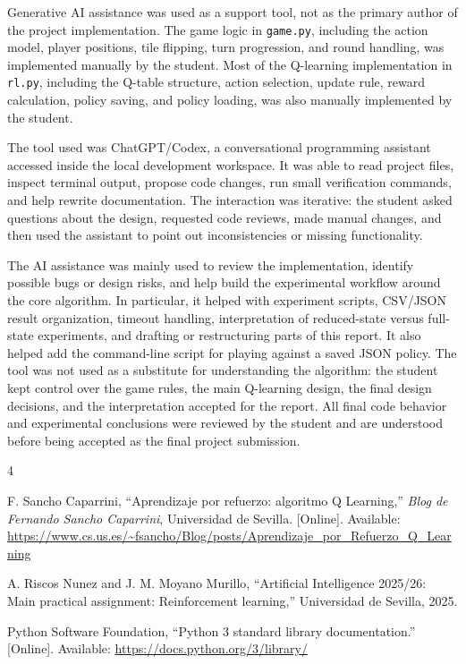 \documentclass[conference]{IEEEtran}
\begin{document}
Generative AI assistance was used as a support tool, not as the primary author of
the project implementation. The game logic in \texttt{game.py}, including the
action model, player positions, tile flipping, turn progression, and round
handling, was implemented manually by the student. Most of the Q-learning
implementation in \texttt{rl.py}, including the Q-table structure, action
selection, update rule, reward calculation, policy saving, and policy loading, was
also manually implemented by the student.

The tool used was ChatGPT/Codex, a conversational programming assistant accessed
inside the local development workspace. It was able to read project files, inspect
terminal output, propose code changes, run small verification commands, and help
rewrite documentation. The interaction was iterative: the student asked questions
about the design, requested code reviews, made manual changes, and then used the
assistant to point out inconsistencies or missing functionality.

The AI assistance was mainly used to review the implementation, identify possible
bugs or design risks, and help build the experimental workflow around the core
algorithm. In particular, it helped with experiment scripts, CSV/JSON result
organization, timeout handling, interpretation of reduced-state versus full-state
experiments, and drafting or restructuring parts of this report. It also helped
add the command-line script for playing against a saved JSON policy. The tool was
not used as a substitute for understanding the algorithm: the student kept control
over the game rules, the main Q-learning design, the final design decisions, and
the interpretation accepted for the report. All final code behavior and
experimental conclusions were reviewed by the student and are understood before
being accepted as the final project submission.

\begin{thebibliography}{4}

F. Sancho Caparrini, ``Aprendizaje por refuerzo: algoritmo Q Learning,''
\emph{Blog de Fernando Sancho Caparrini}, Universidad de Sevilla. [Online].
Available:
\url{https://www.cs.us.es/~fsancho/Blog/posts/Aprendizaje_por_Refuerzo_Q_Learning}

A. Riscos Nunez and J. M. Moyano Murillo, ``Artificial Intelligence 2025/26:
Main practical assignment: Reinforcement learning,'' Universidad de Sevilla,
2025.

Python Software Foundation, ``Python 3 standard library documentation.'' [Online].
Available: \url{https://docs.python.org/3/library/}

\end{thebibliography}
\end{document}
